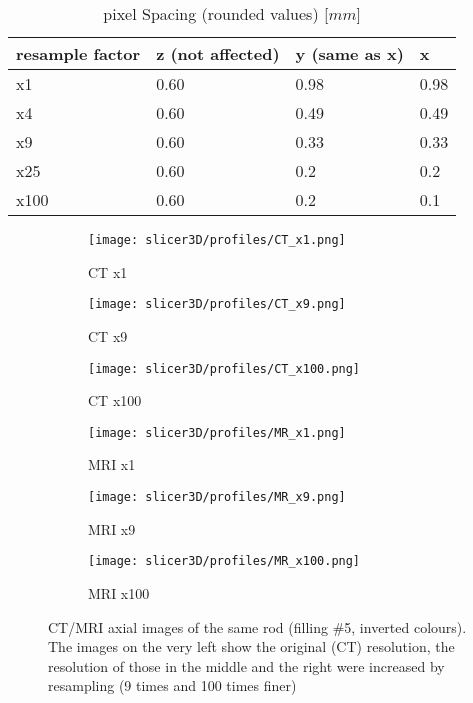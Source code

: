 \begin{table}[!htb]
\centering
\begin{tabular}{l|l|l|l}
resample factor  & z (not affected) &  y (same as x) & x \\
\toprule
x1     & 0.60 & 0.98	& 0.98	\\
x4     & 0.60 & 0.49	& 0.49	\\
x9     & 0.60 & 0.33	& 0.33	\\
x25    & 0.60 & 0.2 	& 0.2	\\
x100   & 0.60 & 0.2 	& 0.1
\end{tabular}
\caption{pixel Spacing (rounded values) [$mm$]}
\label{tab:spacing}
\end{table}


\begin{figure}[!thb]
  \begin{subfigure}[b]{0.32\textwidth}
    \texttt{[image: slicer3D/profiles/CT\_x1.png]}
    \caption{CT x1}
    \label{fig:CT_x1}
  \end{subfigure}
  \hfill
  \begin{subfigure}[b]{0.32\textwidth}
    \texttt{[image: slicer3D/profiles/CT\_x9.png]}
    \caption{CT x9}
    \label{fig:CT_x9}
  \end{subfigure}
    \hfill
  \begin{subfigure}[b]{0.32\textwidth}
    \texttt{[image: slicer3D/profiles/CT\_x100.png]}
    \caption{CT x100}
    \label{fig:CT_x100}
  \end{subfigure}
  \begin{subfigure}[b]{0.32\textwidth}
    \texttt{[image: slicer3D/profiles/MR\_x1.png]}
    \caption{MRI x1}
    \label{fig:MRI_x1}
  \end{subfigure}
  \hfill
  \begin{subfigure}[b]{0.32\textwidth}
    \texttt{[image: slicer3D/profiles/MR\_x9.png]}
    \caption{MRI x9}
    \label{fig:MRI_x9}
  \end{subfigure}
    \hfill
  \begin{subfigure}[b]{0.32\textwidth}
    \texttt{[image: slicer3D/profiles/MR\_x100.png]}
    \caption{MRI x100}
    \label{fig:MRI_x100}
  \end{subfigure}
  \caption{CT/MRI axial images of the same rod (filling \#5, inverted colours). The images on the very left show the original (CT) resolution, the resolution of those in the middle and the right were increased by resampling (9 times and 100 times finer)}
  \label{fig:resample}
\end{figure}
\clearpage


